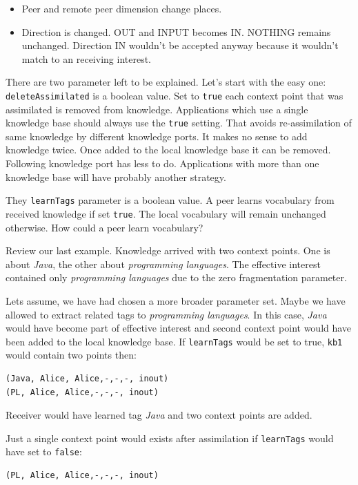 \begin{itemize}
\item Peer and remote peer dimension change places.
\item Direction is changed. OUT and INPUT becomes IN. NOTHING remains unchanged. Direction IN wouldn't be accepted anyway because it wouldn't match to an receiving interest.
\end{itemize}

There are two parameter left to be explained. Let's start with the easy one: 
{\tt deleteAssimilated} is a boolean value. Set to {\tt true} each context point that was assimilated is removed from knowledge. Applications which use a single knowledge base should always use the {\tt true} setting. That avoids re-assimilation of same knowledge by different knowledge ports. It makes no sense to add knowledge twice. Once added to the local knowledge base it can be removed. Following knowledge port has less to do. Applications with more than one knowledge base will have probably another strategy.

They {\tt learnTags} parameter is a boolean value. A peer learns vocabulary from received knowledge if set {\tt true}. The local vocabulary will remain unchanged otherwise. How could a peer learn vocabulary?

Review our last example. Knowledge arrived with two context points. One is about {\it Java}, the other about {\it programming languages}. The effective interest contained only {\it programming languages} due to the zero fragmentation parameter. 

Lets assume, we have had chosen a more broader parameter set. Maybe we have allowed to extract related tags to {\it programming languages}. In this case, {\it Java} would have become part of effective interest and second context point would have been added to the local knowledge base. If {\tt learnTags} would be set to true, {\tt kb1} would contain two points then:

\begin{verbatim}
(Java, Alice, Alice,-,-,-, inout)
(PL, Alice, Alice,-,-,-, inout)
\end{verbatim}

Receiver would have learned tag {\it Java} and two context points are added.

Just a single context point would exists after assimilation if {\tt learnTags} would have set to {\tt false}: 

\begin{verbatim}
(PL, Alice, Alice,-,-,-, inout)
\end{verbatim}

